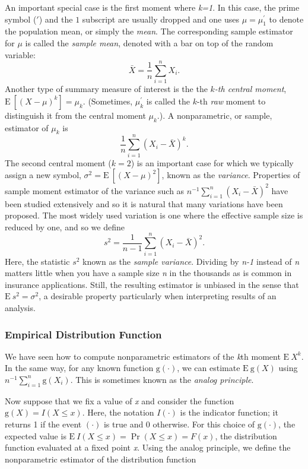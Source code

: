 \documentclass[]{book}
\theoremstyle{definition}
\theoremstyle{definition}
\theoremstyle{definition}
\theoremstyle{remark}
\begin{document}
An important special case is the first moment where \emph{k=1}. In this
case, the prime symbol (\(\prime\)) and the \(1\) subscript are usually
dropped and one uses \(\mu=\mu^{\prime}_1\) to denote the population
mean, or simply the \emph{mean}. The corresponding sample estimator for
\(\mu\) is called the \emph{sample mean}, denoted with a bar on top of
the random variable: \[
\bar{X} =\frac{1}{n} \sum_{i=1}^n X_i .
\] Another type of summary measure of interest is the the \(k\)\emph{-th
central moment}, \(\mathrm{E~} [(X-\mu)^k] = \mu_k\). (Sometimes,
\(\mu^{\prime}_k\) is called the \(k\)-th \emph{raw} moment to
distinguish it from the central moment \(\mu_k\).). A nonparametric, or
sample, estimator of \(\mu_k\) is \[
\frac{1}{n} \sum_{i=1}^n \left(X_i - \bar{X}\right)^k .
\] The second central moment (\(k=2\)) is an important case for which we
typically assign a new symbol, \(\sigma^2 = \mathrm{E~} [(X-\mu)^2]\),
known as the \emph{variance}. Properties of sample moment estimator of
the variance such as \(n^{-1}\sum_{i=1}^n \left(X_i - \bar{X}\right)^2\)
have been studied extensively and so it is natural that many variations
have been proposed. The most widely used variation is one where the
effective sample size is reduced by one, and so we define \[
s^2 = \frac{1}{n-1} \sum_{i=1}^n \left(X_i - \bar{X}\right)^2.
\] Here, the statistic \(s^2\) known as the \emph{sample variance}.
Dividing by \emph{n-1} instead of \emph{n} matters little when you have
a sample size \emph{n} in the thousands as is common in insurance
applications. Still, the resulting estimator is unbiased in the sense
that \(\mathrm{E~} s^2 = \sigma^2\), a desirable property particularly
when interpreting results of an analysis.

\subsubsection{Empirical Distribution
Function}\label{empirical-distribution-function}

We have seen how to compute nonparametric estimators of the \emph{k}th
moment \(\mathrm{E~} X^k\). In the same way, for any known function
\(\mathrm{g}(\cdot)\), we can estimate \(\mathrm{E~} \mathrm{g}(X)\)
using \(n^{-1}\sum_{i=1}^n \mathrm{g}(X_i)\). This is sometimes known as
the \emph{analog principle}.

Now suppose that we fix a value of \emph{x} and consider the function
\(\mathrm{g}(X) = I(X \le x)\). Here, the notation \(I(\cdot)\) is the
indicator function; it returns 1 if the event \((\cdot)\) is true and 0
otherwise. For this choice of \(\mathrm{g}(\cdot)\), the expected value
is \(\mathrm{E~} I(X \le x) = \Pr(X \le x) = F(x)\), the distribution
function evaluated at a fixed point \emph{x}. Using the analog
principle, we define the nonparametric estimator of the distribution
function
\end{document}
